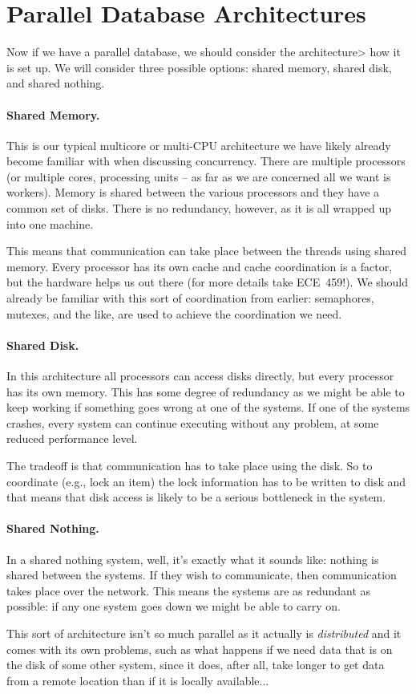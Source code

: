 \section*{Parallel Database Architectures}

Now if we have a parallel database, we should consider the architecture> how it is set up. We will consider three possible options: shared memory, shared disk, and shared nothing.

\paragraph{Shared Memory.} This is our typical multicore or multi-CPU architecture we have likely already become familiar with when discussing concurrency. There are multiple processors (or multiple cores, processing units -- as far as we are concerned all we want is workers). Memory is shared between the various processors and they have a common set of disks. There is no redundancy, however, as it is all wrapped up into one machine.

This means that communication can take place between the threads using shared memory. Every processor has its own cache and cache coordination is a factor, but the hardware helps us out there (for more details take ECE~459!). We should already be familiar with this sort of coordination from earlier: semaphores, mutexes, and the like, are used to achieve the coordination we need.

\paragraph{Shared Disk.} In this architecture all processors can access disks directly, but every processor has its own memory. This has some degree of redundancy as we might be able to keep working if something goes wrong at one of the systems. If one of the systems crashes, every system can continue executing without any problem, at some reduced performance level. 

The tradeoff is that communication has to take place using the disk. So to coordinate (e.g., lock an item) the lock information has to be written to disk and that means that disk access is likely to be a serious bottleneck in the system.

\paragraph{Shared Nothing.} In a shared nothing system, well, it's exactly what it sounds like: nothing is shared between the systems. If they wish to communicate, then communication takes place over the network. This means the systems are as redundant as possible: if any one system goes down we might be able to carry on. 

This sort of architecture isn't so much parallel as it actually is \textit{distributed} and it comes with its own problems, such as what happens if we need data that is on the disk of some other system, since it does, after all, take longer to get data from a remote location than if it is locally available...




